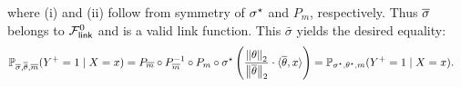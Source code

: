 where (i) and (ii) follow from symmetry of $\sigma^\star$ and $P_m$, respectively. Thus $\overline{\sigma}$ belongs to $\mathcal{F}_{\mathsf{link}}^0$ and is a valid link function. This $\bar{\sigma}$ yields the desired equality:
\begin{align*}
	\mathbb{P}_{\overline{\sigma}, \overline{\theta}, \overline{m}}(Y^+ = 1 \mid X=x) &   = P_{\overline{m}} \circ P_{\overline{m}}^{-1} \circ P_{m} \circ \sigma^\star \left(\frac{\left\|{\theta}\right\|_2}{\left\|{\overline{\theta}}\right\|_2} \cdot \langle \overline{\theta}, x \rangle \right)  = \mathbb{P}_{\sigma^\star, \theta^\star, m} (Y^+ = 1 \mid X=x).
\end{align*}
